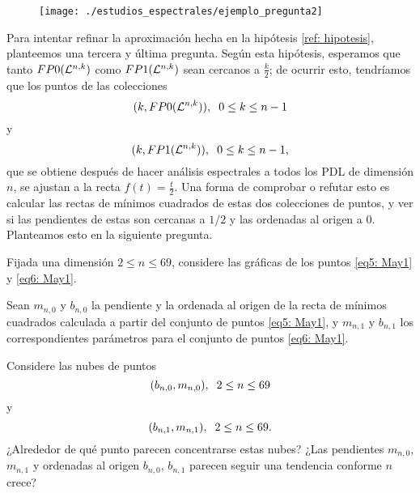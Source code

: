 \begin{figure}[H]
	\centering
	\texttt{[image: ./estudios\_espectrales/ejemplo\_pregunta2]} 
\end{figure}	


Para intentar refinar la aproximación hecha
en la hipótesis 
\ref{ref: hipotesis}, 
planteemos una tercera y última pregunta. 
Según esta hipótesis,
esperamos que tanto $FP0(\mathcal{L}^{n,k})$
como $FP1(\mathcal{L}^{n,k})$ sean cercanos a 
$\frac{k}{2}$; de ocurrir esto, tendríamos que los puntos de
las colecciones 
\begin{equation}
\label{eq5: May1}
(k, FP0(\mathcal{L}^{n,k})), \hspace{0.2cm} 0 \leq k \leq n-1
\end{equation}
y 
\begin{equation}
\label{eq6: May1}
(k, FP1(\mathcal{L}^{n,k})), \hspace{0.2cm} 0 \leq k \leq n-1,
\end{equation}
que se obtiene después de hacer análisis espectrales
a todos los PDL de dimensión $n$,
se ajustan a la recta $f(t) = \frac{t}{2}$. 
Una forma de comprobar o refutar esto es calcular las
rectas de mínimos cuadrados de estas dos colecciones
de puntos, y ver si las pendientes de estas son cercanas
a $1/2$ y las ordenadas al origen a $0$.
Planteamos esto en la siguiente pregunta.


\begin{pregunta}
\label{preg 3}
Fijada una dimensión $2 \leq n \leq 69$,
considere las gráficas de los
puntos \eqref{eq5: May1}
y \eqref{eq6: May1}.

Sean $m_{n,0}$ y $b_{n,0}$ la pendiente y la ordenada
al origen de la recta de mínimos cuadrados calculada a 
partir del conjunto de puntos 
\eqref{eq5: May1}, y
$m_{n,1}$ y $b_{n,1}$ los correspondientes parámetros
para el conjunto de puntos 
\eqref{eq6: May1}.

Considere las nubes de puntos 
\[
(b_{n,0}, m_{n,0}), \hspace{0.2cm} 2 \leq n \leq 69
\]
y 
\[
(b_{n,1}, m_{n,1}), \hspace{0.2cm} 2 \leq n \leq 69.
\]
¿Alrededor de qué punto parecen concentrarse estas nubes?
¿Las pendientes $m_{n,0}$, $m_{n,1}$ y ordenadas al origen 
$b_{n,0}$, $b_{n,1}$ parecen seguir una tendencia conforme
$n$ crece?
\end{pregunta}


